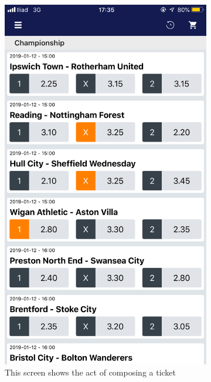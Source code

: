 \documentclass[numbers=noenddot, 12pt, a4paper, oneside]{scrbook}
\begin{document}
\begin{figure}[H]
	\begin{subfigure}{.5\textwidth}
		\centering
		\includegraphics[width=.8\linewidth]{images/Screen/ComposizioneSchedina}
		\caption{This screen shows the act of composing a ticket}
	\end{subfigure}
	\begin{subfigure}{.5\textwidth}
		\centering

\end{subfigure}
\end{figure}
\end{document}
